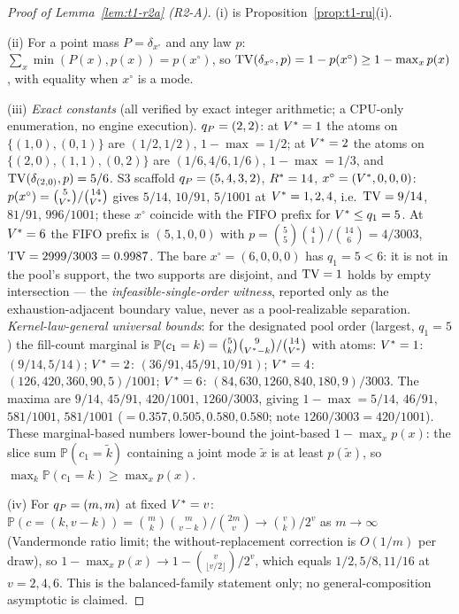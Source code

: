 
\begin{proof}[Proof of Lemma~\ref{lem:t1-r2a} (R2-A)]
(i) is Proposition~\ref{prop:t1-ru}(i).

(ii) For a point mass $P = \delta_{x^{\circ}}$ and any law $p$:
$\sum_x \min(P(x), p(x)) = p(x^{\circ})$, so
$\operatorname{TV}(\delta_{x^{\circ}}, p) = 1 - p(x^{\circ}) \geq 1 - \max_x p(x)$, with
equality when $x^{\circ}$ is a mode.

(iii) \emph{Exact constants} (all verified by exact integer arithmetic; a
CPU-only enumeration, no engine execution). $q_{P} = (2,2)$: at $V^{*} = 1$
the atoms on $\{(1,0),(0,1)\}$ are $(1/2,1/2)$, $1 - \max = 1/2$; at
$V^{*} = 2$ the atoms on $\{(2,0),(1,1),(0,2)\}$ are
$(1/6, 4/6, 1/6)$, $1 - \max = 1/3$, and $\operatorname{TV}(\delta_{(2,0)}, p) = 5/6$.
S3 scaffold $q_{P} = (5,4,3,2)$, $R^{*} = 14$, $x^{\circ} = (V^{*},0,0,0)$:
$p(x^{\circ}) = \binom{5}{V^{*}}/\binom{14}{V^{*}}$ gives $5/14$,
$10/91$, $5/1001$ at $V^{*} = 1,2,4$, i.e.\ $\operatorname{TV} = 9/14$, $81/91$,
$996/1001$; these $x^{\circ}$ coincide with the FIFO prefix for
$V^{*} \leq q_1 = 5$. At $V^{*} = 6$ the FIFO prefix is $(5,1,0,0)$ with
$p = \binom{5}{5}\binom{4}{1}/\binom{14}{6} = 4/3003$, $\operatorname{TV} = 2999/3003 =
0.9987$. The bare $x^{\circ} = (6,0,0,0)$ has $q_1 = 5 < 6$: it is not in
the pool's support, the two supports are disjoint, and $\operatorname{TV} = 1$ holds by
empty intersection --- the \emph{infeasible-single-order witness}, reported
only as the exhaustion-adjacent boundary value, never as a pool-realizable
separation. \emph{Kernel-law-general universal bounds}: for the designated
pool order (largest, $q_1 = 5$) the fill-count marginal is
$\mathbb{P}(c_1 = k) = \binom{5}{k}\binom{9}{V^{*} -
k}/\binom{14}{V^{*}}$ with atoms: $V^{*} = 1$: $(9/14, 5/14)$;
$V^{*} = 2$: $(36/91, 45/91, 10/91)$; $V^{*} = 4$: $(126, 420, 360, 90,
5)/1001$; $V^{*} = 6$: $(84, 630, 1260, 840, 180, 9)/3003$. The maxima
are $9/14$, $45/91$, $420/1001$, $1260/3003$, giving $1 - \max = 5/14$,
$46/91$, $581/1001$, $581/1001$ ($= 0.357, 0.505, 0.580, 0.580$; note
$1260/3003 = 420/1001$). These marginal-based numbers lower-bound the
joint-based $1 - \max_x p(x)$: the slice sum
$\mathbb{P}(c_1 = \tilde{k})$ containing a joint mode $\tilde{x}$ is at
least $p(\tilde{x})$, so $\max_k \mathbb{P}(c_1 = k) \geq \max_x p(x)$.

(iv) For $q_{P} = (m,m)$ at fixed $V^{*} = v$:
$\mathbb{P}(c = (k, v-k)) = \binom{m}{k}\binom{m}{v-k}/\binom{2m}{v} \to
\binom{v}{k}/2^{v}$ as $m \to \infty$ (Vandermonde ratio limit; the
without-replacement correction is $O(1/m)$ per draw), so
$1 - \max_x p(x) \to 1 - \binom{v}{\lfloor v/2 \rfloor}/2^{v}$, which
equals $1/2, 5/8, 11/16$ at $v = 2, 4, 6$. This is the balanced-family
statement only; no general-composition asymptotic is claimed.
\end{proof}

